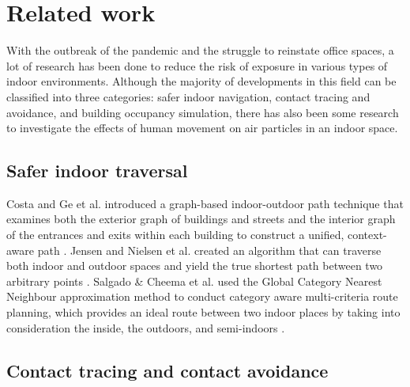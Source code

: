 \documentclass[acmtog]{acmart}
\begin{document}


\section{Related work}
With the outbreak of the pandemic and the struggle to reinstate office spaces, a lot of research has been done to reduce the risk of exposure in various types of indoor environments. Although the majority of developments in this field can be classified into three categories: safer indoor navigation, contact tracing and avoidance, and building occupancy simulation, there has also been some research to investigate the effects of human movement on air particles in an indoor space.

\subsection{Safer indoor traversal}

Costa and Ge et al. introduced a graph-based indoor-outdoor path technique that examines both the exterior graph of buildings and streets and the interior graph of the entrances and exits within each building to construct a unified, context-aware path \cite{costa2019caprio}. Jensen and Nielsen et al. created an algorithm that can traverse both indoor and outdoor spaces and yield the true shortest path between two arbitrary points \cite{jensen2016outdoor}. Salgado \& Cheema et al. used the Global Category Nearest Neighbour approximation method to conduct category aware multi-criteria route planning, which provides an ideal route between two indoor places by taking into consideration the inside, the outdoors, and semi-indoors \cite{salgado2018efficient}.

\subsection{Contact tracing and contact avoidance}
\end{document}
